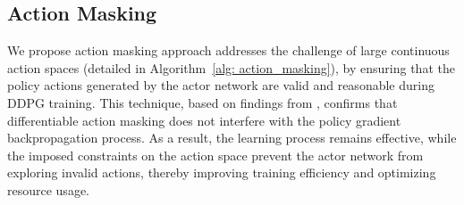 \subsection{Action Masking}
\label{sec: DDPG} 


We propose action masking approach addresses the challenge of large continuous action spaces (detailed in Algorithm~\ref{alg: action_masking}), by ensuring that the policy actions generated by the actor network are valid and reasonable during DDPG training. This technique, based on findings from \cite{huang2020closer,kanervisto2020action}, confirms that differentiable action masking does not interfere with the policy gradient backpropagation process. As a result, the learning process remains effective, while the imposed constraints on the action space prevent the actor network from exploring invalid actions, thereby improving training efficiency and optimizing resource usage.

